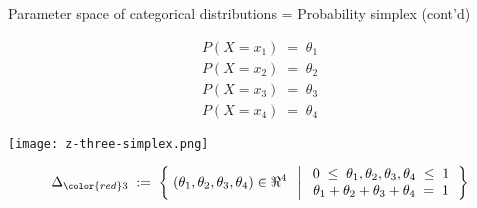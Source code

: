 \begin{frame}{\Large Parameter space of categorical distributions = Probability simplex (cont'd)}

\begin{multicols}{2}

\begin{minipage}{5cm}
\vskip 1.0cm
\begin{equation*}
\begin{array}{c}
P(X=x_{1}) \;=\; \theta_{1} \\
P(X=x_{2}) \;=\; \theta_{2} \\
P(X=x_{3}) \;=\; \theta_{3} \\
P(X=x_{4}) \;=\; \theta_{4}
\end{array}
\end{equation*}
\end{minipage}

\newpage

\begin{minipage}{5cm}
\begin{center}
\texttt{[image: z-three-simplex.png]}
\end{center}
\end{minipage}

\end{multicols}

\vskip -0.4cm
\begin{equation*}
\Delta_{\color{red}3}
\; := \;
\left\{\;
(\theta_{1},\theta_{2},\theta_{3},\theta_{4}) \in \Re^{4}
\;\;\left\vert\;
\begin{array}{c}
	0 \;\leq\; \theta_{1}, \theta_{2}, \theta_{3}, \theta_{4} \;\leq\; 1 \\
	\theta_{1} + \theta_{2} + \theta_{3} + \theta_{4} \;=\; 1
\end{array}
\right.
\right\}
\end{equation*}

\end{frame}
\normalsize

